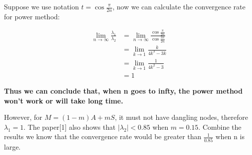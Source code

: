 \documentclass{article}
\begin{document}
\begin{description}
	      Suppose we use notation $t = \cos \frac{\pi}{2n}$, now we can calculate the convergence rate for power method:

	      \begin{align*}
		      \lim_{n\rightarrow \infty}\frac{\lambda_1}{\lambda_2}
		       & = \lim_{n\rightarrow \infty}\frac{\cos \frac{\pi}{2n}}{\cos \frac{3\pi}{2n}} \\
		       & = \lim_{k\rightarrow 1}\frac{k}{4k^3 - 3k}                                   \\
		       & = \lim_{k\rightarrow 1}\frac{1}{4k^2 - 3}                                    \\
		       & = 1
	      \end{align*}

	      \textbf{Thus we can conclude that, when n goes to infty, the power method won't work or will take long time.}

	      However, for $M = (1-m)A + mS$, it must not have dangling nodes, therefore $\lambda_1 = 1$.
	      The paper[1] also shows that $|\lambda_2| < 0.85$ when $m = 0.15$.
	      Combine the results we know that the convergence rate would be greater than $\frac{1}{0.85}$ when n is large.
\end{description}
\end{document}

